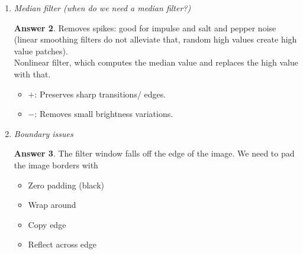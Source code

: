 \documentclass[a4paper,12 pt]{article}
\theoremstyle{definition}
\theoremstyle{remark}
\theoremstyle{definition}
\theoremstyle{definition}
\theoremstyle{definition}
\theoremstyle{definition}
\theoremstyle{remark}
\theoremstyle{remark}
\theoremstyle{definition}
\theoremstyle{definition}
\newtheorem*{answer}{Answer}
\begin{document}
\begin{enumerate}
\begin{answer}
\end{answer}
\item \textit{Median filter (when do we need a median filter?)}
\begin{answer}
Removes spikes: good for impulse and salt and pepper noise (linear smoothing filters do not alleviate that, random high values create high value patches). \\
Nonlinear filter, which computes the median value and replaces the high value with that. 
\begin{itemize}
\item $+$: Preserves sharp transitions/ edges.
\item $-$: Removes small brightness variations.
\end{itemize}
\end{answer}
\item \textit{Boundary issues}
\begin{answer}
The filter window falls off the edge of the image. We need to pad the image borders with
\begin{itemize}
\item Zero padding (black)
\item Wrap around
\item Copy edge
\item Reflect across edge
\end{itemize}
\end{answer}
\end{enumerate}
\end{document}
